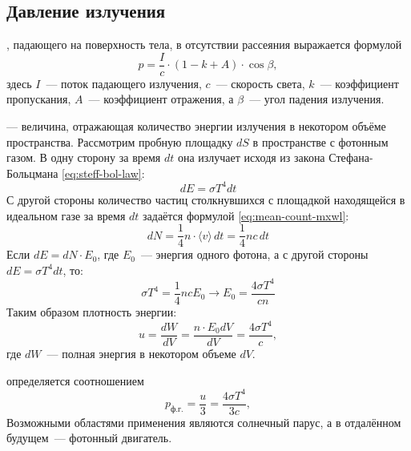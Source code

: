 \subsection{Давление излучения}
, падающего на поверхность тела, в отсутствии рассеяния выражается формулой
\begin{equation}
    p = \frac{I}{c} \cdot (1 - k + A) \cdot \cos \beta,
\end{equation}
здесь $I$~--- поток падающего излучения, $c$~--- скорость света, $k$~--- коэффициент пропускания, $A$~--- коэффициент отражения, а $\beta$~--- угол падения излучения.

 — величина, отражающая количество энергии излучения в некотором объёме пространства. Рассмотрим пробную  площадку $dS$ в пространстве с фотонным газом. В одну сторону за время $dt$ она излучает исходя из закона Стефана-Больцмана \eqref{eq:steff-bol-law}:
\begin{equation*}
	d E=\sigma T^4 d t
\end{equation*}
С другой стороны количество частиц столкнувшихся с площадкой находящейся в идеальном газе за время $dt$ задаётся формулой \eqref{eq:mean-count-mxwl}:
\begin{equation*}
d N=\frac{1}{4} n \cdot\langle v\rangle \, d t=\frac{1}{4} n c \, d t
\end{equation*}
Если $d E=d N \cdot E_0$, где $E_0$~--- энергия одного фотона, а с другой стороны $d E=\sigma T^4 d t$, то:
\begin{equation*}
\sigma T^4=\frac{1}{4} n c E_0 \rightarrow E_0=\frac{4 \sigma T^4}{c n}
\end{equation*}
Таким образом плотность энергии:
\begin{equation}
	u=\frac{d W}{d V}=\frac{n \cdot E_0 d V}{d V}=\frac{4 \sigma T^4}{c},
\end{equation}
где $dW$~--- полная энергия в некотором объеме $dV$.

 определяется соотношением
\begin{equation}
    p_\text{ф.г.} = \frac{u}{3} = \frac{4 \sigma T^4}{3c},
\end{equation}
Возможными областями применения являются солнечный парус, а в отдалённом будущем~--- фотонный двигатель.
